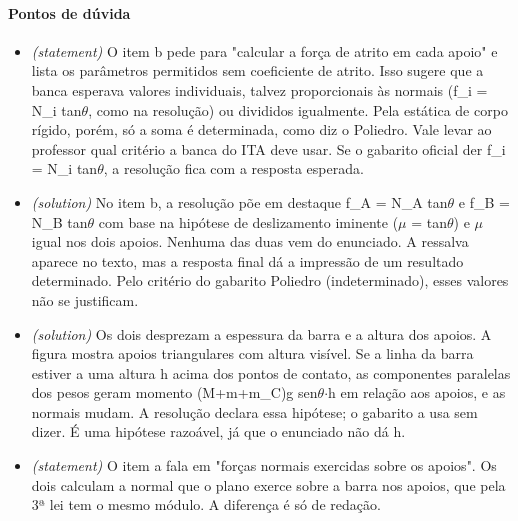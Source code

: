 \documentclass{article}%
\begin{document}
\paragraph{Pontos de dúvida}%
\begin{itemize}%
\item%
\textit{(statement)} O item b pede para "calcular a força de atrito em cada apoio" e lista os parâmetros permitidos sem coeficiente de atrito. Isso sugere que a banca esperava valores individuais, talvez proporcionais às normais (f\_i = N\_i tan$\theta$, como na resolução) ou divididos igualmente. Pela estática de corpo rígido, porém, só a soma é determinada, como diz o Poliedro. Vale levar ao professor qual critério a banca do ITA deve usar. Se o gabarito oficial der f\_i = N\_i tan$\theta$, a resolução fica com a resposta esperada.%
\item%
\textit{(solution)} No item b, a resolução põe em destaque f\_A = N\_A tan$\theta$ e f\_B = N\_B tan$\theta$ com base na hipótese de deslizamento iminente ($\mu$ = tan$\theta$) e $\mu$ igual nos dois apoios. Nenhuma das duas vem do enunciado. A ressalva aparece no texto, mas a resposta final dá a impressão de um resultado determinado. Pelo critério do gabarito Poliedro (indeterminado), esses valores não se justificam.%
\item%
\textit{(solution)} Os dois desprezam a espessura da barra e a altura dos apoios. A figura mostra apoios triangulares com altura visível. Se a linha da barra estiver a uma altura h acima dos pontos de contato, as componentes paralelas dos pesos geram momento (M+m+m\_C)g sen$\theta$$\cdot$h em relação aos apoios, e as normais mudam. A resolução declara essa hipótese; o gabarito a usa sem dizer. É uma hipótese razoável, já que o enunciado não dá h.%
\item%
\textit{(statement)} O item a fala em "forças normais exercidas sobre os apoios". Os dois calculam a normal que o plano exerce sobre a barra nos apoios, que pela 3ª lei tem o mesmo módulo. A diferença é só de redação.%
\end{itemize}%
\end{document}
